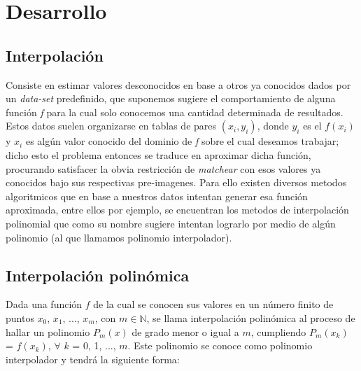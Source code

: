 \section{Desarrollo}

\subsection{Interpolación}

Consiste en estimar valores desconocidos en base a otros ya conocidos dados por un \textit{data-set} predefinido, que suponemos sugiere el comportamiento de alguna función \textit{f} para la cual solo conocemos una cantidad determinada de resultados. Estos datos suelen organizarse en tablas de pares $(x_i,y_i)$, donde $y_i$ es el $f(x_i)$ y $x_i$ es algún valor conocido del dominio de \textit{f} sobre el cual deseamos trabajar; dicho esto el problema entonces se traduce en aproximar dicha función, procurando satisfacer la obvia restricción de \textit{matchear} con esos valores ya conocidos bajo sus respectivas pre-imagenes. Para ello existen diversos metodos algoritmicos que en base a nuestros datos intentan generar esa función aproximada, entre ellos por ejemplo, se encuentran los metodos de interpolación polinomial que como su nombre sugiere intentan lograrlo por medio de algún polinomio (al que llamamos polinomio interpolador). 



\subsection{Interpolación polinómica}

Dada una función $f$ de la cual se conocen sus valores en un número finito de puntos $x_0$, $x_1$, ..., $x_m$, con $m \in \mathbb{N}$, se llama interpolación polinómica al proceso de hallar un polinomio $P_m(x)$ de grado menor o igual a $m$, cumpliendo $P_m(x_k)$ = $f(x_k)$,  $\forall$ $k$ = 0, 1, ..., $m$.
Este polinomio se conoce como polinomio interpolador y tendrá la siguiente forma:

